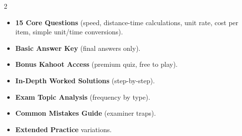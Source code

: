 \documentclass[11pt,a4paper]{article}
\newcommand{\FullReleaseDate}{April 30, 2026}
\begin{document}
\vspace{8pt}

\begin{multicols}{2}
  \begin{tcolorbox}[card, title=\sffamily\bfseries\textcolor{white}{\faHandPointDown\ TODAY (Simplified Version)}, colbacktitle=mainblue, boxed title style={sharp corners, boxrule=0pt}]
    \begin{itemize}[leftmargin=1.2em, itemsep=2pt]
      \item \small \textbf{15 Core Questions} (speed, distance-time calculations, unit rate, cost per item, simple unit/time conversions).
      \item \small \textbf{Basic Answer Key} (final answers only).
      \item \small \textbf{Bonus Kahoot Access} (premium quiz, free to play).
    \end{itemize}
  \end{tcolorbox}

  \columnbreak

  \begin{tcolorbox}[card, title=\sffamily\bfseries\textcolor{white}{\faRocket\ ON \FullReleaseDate\ (Full Upgrade)}, colbacktitle=mainblue, boxed title style={sharp corners, boxrule=0pt}]
    \begin{itemize}[leftmargin=1.2em, itemsep=2pt]
      \item \small \textbf{In-Depth Worked Solutions} (step-by-step).
      \item \small \textbf{Exam Topic Analysis} (frequency by type).
      \item \small \textbf{Common Mistakes Guide} (examiner traps).
      \item \small \textbf{Extended Practice} variations.
    \end{itemize}
  \end{tcolorbox}
\end{multicols}
\end{document}
